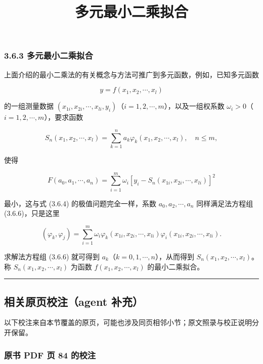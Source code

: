 \documentclass[
  10pt,
  fontset=fandol]{ctexart}
\title{多元最小二乘拟合}
\author{}
\date{}
\begin{document}
\maketitle

\subsubsection{3.6.3 多元最小二乘拟合}\label{ux591aux5143ux6700ux5c0fux4e8cux4e58ux62dfux5408}

上面介绍的最小二乘法的有关概念与方法可推广到多元函数，例如，已知多元函数

\[
y=f(x_1,x_2,\cdots,x_l)
\]

的一组测量数据 \((x_{1i},x_{2i},\cdots,x_{li},y_i)\)（\(i=1,2,\cdots,m\)），以及一组权系数 \(\omega_i>0\)（\(i=1,2,\cdots,m\)），要求函数

\[
S_n(x_1,x_2,\cdots,x_l)=\sum_{k=1}^na_k\varphi_k(x_1,x_2,\cdots,x_l),\quad n\leqslant m,
\]

使得

\[
F(a_0,a_1,\cdots,a_n)=\sum_{i=1}^m\omega_i[y_i-S_n(x_{1i},x_{2i},\cdots,x_{li})]^2
\]

最小，这与式 (3.6.4) 的极值问题完全一样，系数 \(a_0,a_2,\cdots,a_n\) 同样满足法方程组 (3.6.6)，只是这里

\[
(\varphi_k,\varphi_j)=\sum_{i=1}^m\omega_i\varphi_k(x_{1i},x_{2i},\cdots,x_{li})\varphi_i(x_{1i},x_{2i},\cdots,x_{li}).
\]

求解法方程组 (3.6.6) 就可得到 \(a_k\)（\(k=0,1,\cdots,n\)），从而得到 \(S_n(x_1,x_2,\cdots,x_l)\)。称 \(S_n(x_1,x_2,\cdots,x_l)\) 为函数 \(f(x_1,x_2,\cdots,x_l)\) 的最小二乘拟合。

\begin{center}\rule{0.5\linewidth}{0.5pt}\end{center}

\subsection{相关原页校注（agent 补充）}\label{ux76f8ux5173ux539fux9875ux6821ux6ce8agent-ux8865ux5145}

以下校注来自本节覆盖的原页，可能也涉及同页相邻小节；原文照录与校正说明分开保留。

\subsubsection{原书 PDF 页 84 的校注}\label{ux539fux4e66-pdf-ux9875-84-ux7684ux6821ux6ce8}
\end{document}
